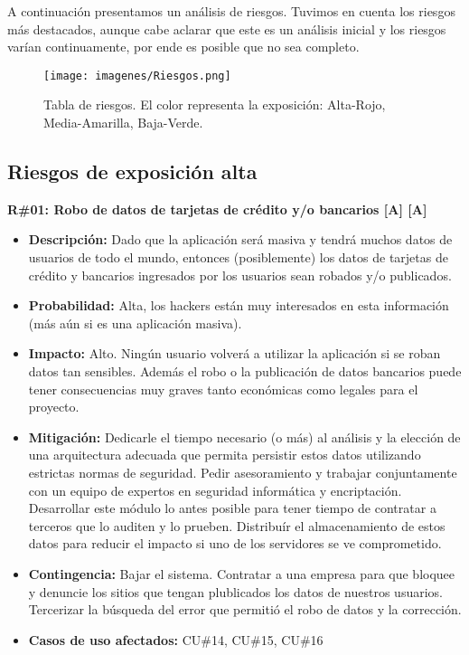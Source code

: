 A continuación presentamos un análisis de riesgos. Tuvimos en cuenta los riesgos más destacados, aunque cabe aclarar que este es un análisis inicial y los riesgos varían continuamente, por ende es posible que no sea completo.

\begin{figure}[h!]
  \centering
  \texttt{[image: imagenes/Riesgos.png]}
  \caption{Tabla de riesgos. El color representa la exposición: Alta-Rojo, Media-Amarilla, Baja-Verde.}
\end{figure}


\subsection{Riesgos de exposición alta}

\noindent\textbf{R\#01: Robo de datos de tarjetas de crédito y/o bancarios [A] [A]} 
\begin{itemize}
	\item{\textbf{Descripción:} Dado que la aplicación será masiva y tendrá muchos datos de usuarios de todo el mundo, entonces (posiblemente) los datos de tarjetas de crédito y bancarios ingresados por los usuarios sean robados y/o publicados.}
	\item{\textbf{Probabilidad:} Alta, los hackers están muy interesados en esta información (más aún si es una aplicación masiva).}
	\item{\textbf{Impacto:} Alto. Ningún usuario volverá a utilizar la aplicación si se roban datos tan sensibles. Además el robo o la publicación de datos bancarios puede tener consecuencias muy graves tanto económicas como legales para el proyecto.}
	\item{\textbf{Mitigación:} Dedicarle el tiempo necesario (o más) al análisis y la elección de una arquitectura adecuada que permita persistir estos datos utilizando estrictas normas de seguridad. Pedir asesoramiento y trabajar conjuntamente con un equipo de expertos en seguridad informática y encriptación. Desarrollar este módulo lo antes posible para tener tiempo de contratar a terceros que lo auditen y lo prueben. Distribuír el almacenamiento de estos datos para reducir el impacto si uno de los servidores se ve comprometido.}
	\item{\textbf{Contingencia:} Bajar el sistema. Contratar a una empresa para que bloquee y denuncie los sitios que tengan plublicados los datos de nuestros usuarios. Tercerizar la búsqueda del error que permitió el robo de datos y la corrección.}
	\item{\textbf{Casos de uso afectados:} CU\#14, CU\#15, CU\#16}
\end{itemize}

